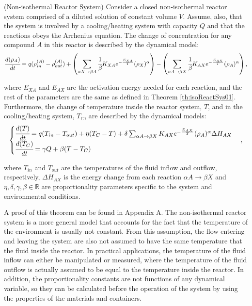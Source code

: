 \documentclass[a4paper,11pt]{book}
\numberwithin{figure}{chapter}
\numberwithin{equation}{chapter}
\numberwithin{table}{chapter}
\newtheorem{theorem}{Theorem}[chapter]
\theoremstyle{definition}
\newcounter{boxed-theorem}
\newenvironment{boxed-theorem}[1]
{\begin{shaded} \begin{theorem}{#1}}
{\end{theorem} \end{shaded}}
\newcounter{boxed-definition}
\begin{document}
\begin{boxed-theorem}{(Non-isothermal Reactor System)} \label{th:exoReactSys01}
    Consider a closed non-isothermal reactor system comprised of a diluted solution of constant volume $V$. Assume, also, that the system is involved by a cooling/heating system with capacity $Q$ and that the reactions obeys the Arrhenius equation. The change of concentration for any compound $A$ in this reactor is described by the dynamical model:
    \begin{equation} \label{eq:exoModel1}
            \cfrac{d (\rho_A)}{dt} = q (\rho^{(A)}_{in} - \rho^{(A)}_{out}) + \left( \sum_{\alpha X \rightarrow \beta A} \cfrac{1}{\beta} K_{XA} e^{-\frac{E_{XA}}{T}} (\rho_X)^{\alpha} \right) - \left(\sum_{\alpha A \rightarrow \beta X} \cfrac{1}{\beta} K_{AX} e^{-\frac{E_{AX}}{T}} (\rho_A)^{\alpha} \right)
    ,\end{equation}

    \noindent where $E_{XA}$ and $E_{AX}$ are the activation energy needed for each reaction, and the rest of the parameters are the same as defined in Theorem \ref{th:isoReactSys01}. Furthermore, the change of temperature inside the reactor system, $T$, and in the cooling/heating system, $T_C$, are described by the dynamical models:
    \begin{align} \label{eq:exoModel2}
    \begin{cases}
        \cfrac{d(T)}{dt} = q(T_{in} - T_{out}) + \eta (T_C - T) + \delta \sum_{\alpha A \rightarrow \beta X} K_{AX} e^{-\frac{E_{AX}}{T}} (\rho_A)^{\alpha} \Delta H_{AX} \\
        \cfrac{d(T_C)}{dt} = \gamma Q + \beta (T - T_C) 
    \end{cases}
    ,\end{align}
    
    \noindent where $T_{in}$ and $T_{out}$ are the temperatures of the fluid inflow and outflow, respectively, $\Delta H_{AX}$ is the energy change from each reaction $\alpha A \rightarrow \beta X$ and $\eta, \delta, \gamma, \beta \in \mathbb{R}$ are proportionality parameters specific to the system and environmental conditions.
\end{boxed-theorem}

A proof of this theorem can be found in Appendix A. The non-isothermal reactor system is a more general model that accounts for the fact that the temperature of the environment is usually not constant. From this assumption, the flow entering and leaving the system are also not assumed to have the same temperature that the fluid inside the reactor. In practical applications, the temperature of the fluid inflow can either be manipulated or measured, where the temperature of the fluid outflow is actually assumed to be equal to the temperature inside the reactor. In addition, the proportionality constants are not functions of any dynamical variable, so they can be calculated before the operation of the system by using the properties of the materials and containers.
\end{document}
